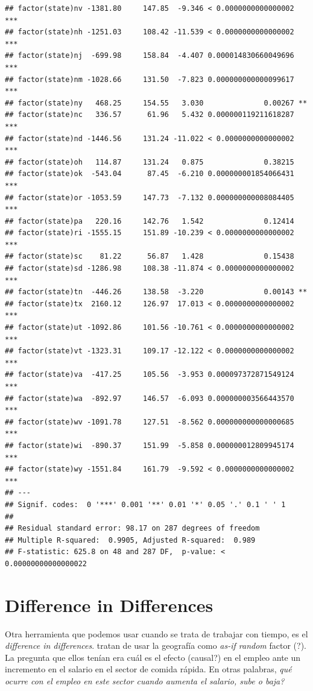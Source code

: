 \documentclass[onesided]{article}\usepackage[]{graphicx}\usepackage[]{color}
\makeatletter
\newenvironment{kframe}{%
 \def\at@end@of@kframe{}%
 \ifinner\ifhmode%
  \def\at@end@of@kframe{\end{minipage}}%
  \begin{minipage}{\columnwidth}%
 \fi\fi%
 \def\FrameCommand##1{\hskip\@totalleftmargin \hskip-\fboxsep
 \colorbox{shadecolor}{##1}\hskip-\fboxsep
     \hskip-\linewidth \hskip-\@totalleftmargin \hskip\columnwidth}%
 \MakeFramed {\advance\hsize-\width
   \@totalleftmargin\z@ \linewidth\hsize
   \@setminipage}}%
 {\par\unskip\endMakeFramed%
 \at@end@of@kframe}
\newenvironment{knitrout}{}{} %
\makeatother
\begin{document}
\begin{knitrout}
\begin{kframe}
\begin{verbatim}
## factor(state)nv -1381.80     147.85  -9.346 < 0.0000000000000002 ***
## factor(state)nh -1251.03     108.42 -11.539 < 0.0000000000000002 ***
## factor(state)nj  -699.98     158.84  -4.407 0.000014830660049696 ***
## factor(state)nm -1028.66     131.50  -7.823 0.000000000000099617 ***
## factor(state)ny   468.25     154.55   3.030              0.00267 ** 
## factor(state)nc   336.57      61.96   5.432 0.000000119211618287 ***
## factor(state)nd -1446.56     131.24 -11.022 < 0.0000000000000002 ***
## factor(state)oh   114.87     131.24   0.875              0.38215    
## factor(state)ok  -543.04      87.45  -6.210 0.000000001854066431 ***
## factor(state)or -1053.59     147.73  -7.132 0.000000000008084405 ***
## factor(state)pa   220.16     142.76   1.542              0.12414    
## factor(state)ri -1555.15     151.89 -10.239 < 0.0000000000000002 ***
## factor(state)sc    81.22      56.87   1.428              0.15438    
## factor(state)sd -1286.98     108.38 -11.874 < 0.0000000000000002 ***
## factor(state)tn  -446.26     138.58  -3.220              0.00143 ** 
## factor(state)tx  2160.12     126.97  17.013 < 0.0000000000000002 ***
## factor(state)ut -1092.86     101.56 -10.761 < 0.0000000000000002 ***
## factor(state)vt -1323.31     109.17 -12.122 < 0.0000000000000002 ***
## factor(state)va  -417.25     105.56  -3.953 0.000097372871549124 ***
## factor(state)wa  -892.97     146.57  -6.093 0.000000003566443570 ***
## factor(state)wv -1091.78     127.51  -8.562 0.000000000000000685 ***
## factor(state)wi  -890.37     151.99  -5.858 0.000000012809945174 ***
## factor(state)wy -1551.84     161.79  -9.592 < 0.0000000000000002 ***
## ---
## Signif. codes:  0 '***' 0.001 '**' 0.01 '*' 0.05 '.' 0.1 ' ' 1
## 
## Residual standard error: 98.17 on 287 degrees of freedom
## Multiple R-squared:  0.9905,	Adjusted R-squared:  0.989 
## F-statistic: 625.8 on 48 and 287 DF,  p-value: < 0.00000000000000022
\end{verbatim}
\end{kframe}
\end{knitrout}


\section{Difference in Differences}

Otra herramienta que podemos usar cuando se trata de trabajar con tiempo, es el \emph{difference in differences}. \textcite{Card1994} tratan de usar la geograf\'ia como \emph{as-if random} factor ({\color{red}?}). La pregunta que ellos ten\'ian era cu\'al es el efecto (causal?) en el empleo ante un incremento en el salario en el sector de comida r\'apida. En otras palabras, \emph{qu\'e ocurre con el empleo en este sector cuando aumenta el salario, sube o baja?}
\end{document}
